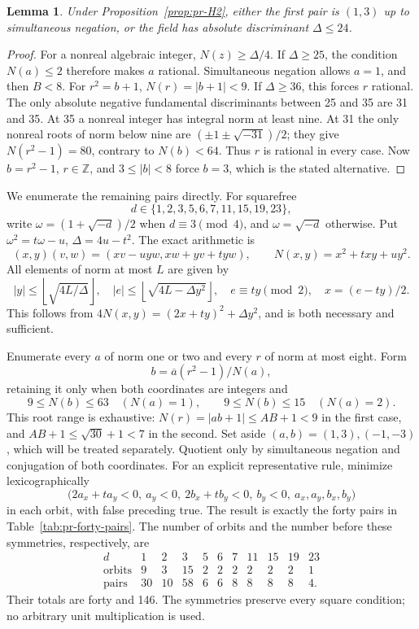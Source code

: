 \documentclass[12pt]{article}
\newtheorem{lemma}[theorem]{Lemma}
\numberwithin{equation}{section}
\begin{document}
\begin{lemma}\label{lem:pr-field24}
Under Proposition~\ref{prop:pr-H2}, either the first pair is
$(1,3)$ up to simultaneous negation, or the field has absolute
discriminant $\Delta\le24$.
\end{lemma}
\begin{proof}
For a nonreal algebraic integer, \(N(z)\ge\Delta/4\).
If \(\Delta\ge25\), the condition \(N(a)\le2\) therefore makes
\(a\) rational. Simultaneous negation allows \(a=1\), and then
\(B<8\). For \(r^2=b+1\),
\(N(r)=|b+1|<9\). If \(\Delta\ge36\), this forces \(r\) rational.
The only absolute negative fundamental discriminants between 25 and 35
are 31 and 35. At 35 a nonreal integer has integral norm at least nine.
At 31 the only nonreal roots of norm below nine are
\((\pm1\pm\sqrt{-31})/2\); they give \(N(r^2-1)=80\), contrary to
\(N(b)<64\). Thus \(r\) is rational in every case. Now
$b=r^2-1$, $r\in\mathbb Z$, and $3\le|b|<8$ force $b=3$,
which is the stated alternative.
\end{proof}

We enumerate the remaining pairs directly. For squarefree
\[
 d\in\{1,2,3,5,6,7,11,15,19,23\},
\]
write \(\omega=(1+\sqrt{-d})/2\) when \(d\equiv3\pmod4\), and
\(\omega=\sqrt{-d}\) otherwise. Put
\(\omega^2=t\omega-u\), \(\Delta=4u-t^2\). The exact arithmetic is
\begin{equation}\label{eq:pr-ring-arithmetic}
 (x,y)(v,w)=(xv-uyw,xw+yv+tyw),\qquad
 N(x,y)=x^2+txy+uy^2.
\end{equation}
All elements of norm at most \(L\) are given by
\begin{equation}\label{eq:pr-disk}
 |y|\le\left\lfloor\sqrt{4L/\Delta}\right\rfloor,\quad
 |e|\le\left\lfloor\sqrt{4L-\Delta y^2}\right\rfloor,\quad
 e\equiv ty\pmod2,\quad x=(e-ty)/2.
\end{equation}
This follows from \(4N(x,y)=(2x+ty)^2+\Delta y^2\), and is both
necessary and sufficient.

Enumerate every \(a\) of norm one or two and every \(r\) of norm at
most eight. Form
\[
 b=\overline a(r^2-1)/N(a),
\]
retaining it only when both coordinates are integers and
\[
 9\le N(b)\le63\quad(N(a)=1),\qquad
 9\le N(b)\le15\quad(N(a)=2).
\]
This root range is exhaustive: \(N(r)=|ab+1|\le AB+1<9\) in the
first case, and \(AB+1\le\sqrt{30}+1<7\) in the second.
Set aside $(a,b)=(1,3),(-1,-3)$, which will be treated separately. Quotient only by simultaneous
negation and conjugation of both coordinates. For an explicit
representative rule, minimize lexicographically
\[
 \bigl(2a_x+ta_y<0,\ a_y<0,\ 2b_x+tb_y<0,\ b_y<0,\ a_x,a_y,b_x,b_y\bigr)
\]
in each orbit, with false preceding true. The result is exactly the
forty pairs in Table~\ref{tab:pr-forty-pairs}. The number of orbits
and the number before these symmetries, respectively, are
\[
\begin{array}{c|rrrrrrrrrr}
 d&1&2&3&5&6&7&11&15&19&23\\\hline
 \text{orbits}&9&3&15&2&2&2&2&2&2&1\\
 \text{pairs}&30&10&58&6&6&8&8&8&8&4.
\end{array}
\]
Their totals are forty and 146. The symmetries preserve every square
condition; no arbitrary unit multiplication is used.
\end{document}
